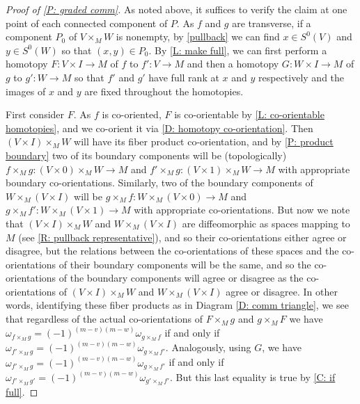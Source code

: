 \begin{proof}[Proof of \cref{P: graded comm}]
	As noted above, it suffices to verify the claim at one point of each connected component of $P$.
	As $f$ and $g$ are transverse, if a component $P_0$ of $V \times_M W$ is nonempty, by \cref{pullback} we can find $x \in S^0(V)$ and $y \in S^0(W)$ so that $(x,y) \in P_0$.
	By \cref{L: make full}, we can first perform a homotopy $F \colon V \times I \to M$ of $f$ to $f' \colon V \to M$ and then a homotopy $G \colon W \times I \to M$ of $g$ to $g' \colon W \to M$ so that $f'$ and $g'$ have full rank at $x$ and $y$ respectively and the images of $x$ and $y$ are fixed throughout the homotopies.

	First consider $F$.
	As $f$ is co-oriented, $F$ is co-orientable by \cref{L: co-orientable homotopies}, and we co-orient it via \cref{D: homotopy co-orientation}.
	Then $(V \times I) \times_M W$ will have its fiber product co-orientation, and by \cref{P: product boundary} two of its boundary components will be (topologically) $f \times_M g \colon (V \times 0) \times_M W \to M$ and
	$f' \times_M g \colon (V \times 1) \times_M W \to M$ with appropriate boundary co-orientations.
	Similarly, two of the boundary components of $W \times_M (V \times I)$ will be $g \times_M f: W \times_M (V \times 0) \to M$ and
	$g \times_M f' \colon W \times_M (V \times 1) \to M$ with appropriate co-orientations.
	But now we note that $(V \times I) \times_M W$ and $W \times_M (V \times I)$ are diffeomorphic as spaces mapping to $M$ (see \cref{R: pullback representative}), and so their co-orientations either agree or disagree, but the relations between the co-orientations of these spaces and the co-orientations of their boundary components will be the same, and so the co-orientations of the boundary components will agree or disagree as the co-orientations of $(V \times I) \times_M W$ and $W \times_M (V \times I)$ agree or disagree.
	In other words, identifying these fiber products as in Diagram \eqref{D: comm triangle}, we see that regardless of the actual co-orientations of $F \times_M g$ and $g \times_M F$ we have $\omega_{f \times_M g} = (-1)^{(m-v)(m-w)}\omega_{g \times_M f}$ if and only if $\omega_{f' \times_M g} = (-1)^{(m-v)(m-w)}\omega_{g \times_M f'}$.
	Analogously, using $G$, we have $\omega_{f' \times_M g} = (-1)^{(m-v)(m-w)}\omega_{g \times_M f'}$ if and only if $\omega_{f' \times_M g'} = (-1)^{(m-v)(m-w)}\omega_{g' \times_M f'}$.
	But this last equality is true by \cref{C: if full}.
\end{proof}

